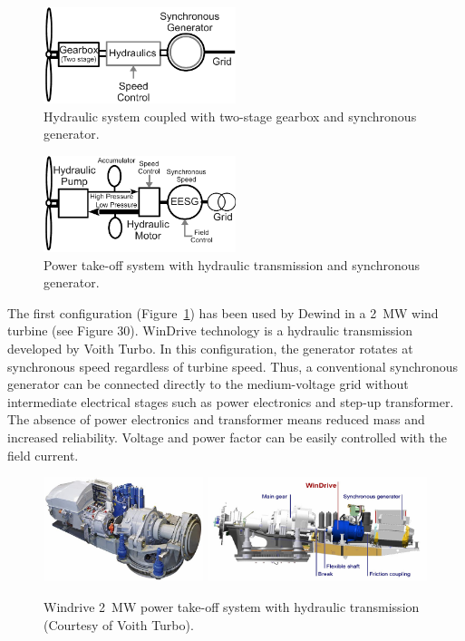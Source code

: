 \documentclass[a4paper, 11pt]{article} %
\begin{document}
  \begin{figure}
    \centering
    \includegraphics[width=0.5\textwidth]{hydraulics}
    \caption{Hydraulic system coupled with two-stage gearbox and synchronous generator.} 
    \label{hydraulics}
  \end{figure}


  \begin{figure}
    \centering
    \includegraphics[width=0.5\textwidth]{EESG_hydraulics}
    \caption{Power take-off system with hydraulic transmission and synchronous generator.} 
    \label{eesg_hydraulics}
  \end{figure}

The first configuration (Figure~\ref{hydraulics}) has been used by Dewind in a 2~MW wind turbine (see Figure 30). WinDrive technology is a hydraulic transmission developed by Voith Turbo. In this configuration, the generator rotates at synchronous speed regardless of turbine speed. Thus, a conventional synchronous generator can be connected directly to the medium-voltage grid without intermediate electrical stages such as power electronics and step-up transformer. The absence of power electronics and transformer means reduced mass and increased reliability. Voltage and power factor can be easily controlled with the field current.

  \begin{figure}
    \centering
    \includegraphics[height=1.2in]{voith_windrive}
    \includegraphics[height=1.2in]{voith_schematic}
    \caption{Windrive 2~MW power take-off system with hydraulic transmission (Courtesy of Voith Turbo).} 
    \label{voith}
  \end{figure}
\end{document}
